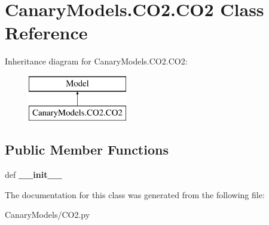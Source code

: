 \hypertarget{class_canary_models_1_1_c_o2_1_1_c_o2}{\section{Canary\-Models.\-C\-O2.\-C\-O2 Class Reference}
\label{class_canary_models_1_1_c_o2_1_1_c_o2}
}
Inheritance diagram for Canary\-Models.\-C\-O2.\-C\-O2\-:\begin{figure}[H]
\begin{center}
\leavevmode
\includegraphics[height=2.000000cm]{class_canary_models_1_1_c_o2_1_1_c_o2}
\end{center}
\end{figure}
\subsection*{Public Member Functions}
\begin{DoxyCompactItemize}
\item 
\hypertarget{class_canary_models_1_1_c_o2_1_1_c_o2_a900e93e586e183f0515f566b08a08af2}{def {\bfseries \-\_\-\-\_\-init\-\_\-\-\_\-}}\label{class_canary_models_1_1_c_o2_1_1_c_o2_a900e93e586e183f0515f566b08a08af2}

\end{DoxyCompactItemize}


The documentation for this class was generated from the following file\-:\begin{DoxyCompactItemize}
\item 
Canary\-Models/C\-O2.\-py\end{DoxyCompactItemize}
